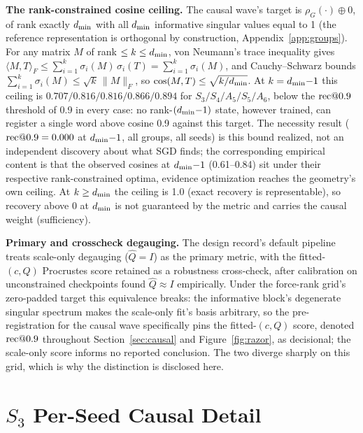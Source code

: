 \textbf{The rank-constrained cosine ceiling.} The causal wave's target
is $\rho_G(\cdot) \oplus 0$, of rank exactly $d_{\min}$ with all $d_{\min}$
informative singular values equal to 1 (the reference representation is
orthogonal by construction, Appendix~\ref{app:groups}). For any matrix
$M$ of rank $\leq k \leq d_{\min}$, von Neumann's trace inequality gives
$\langle M, T\rangle_F \leq \sum_{i=1}^{k} \sigma_i(M)\,\sigma_i(T) =
\sum_{i=1}^{k} \sigma_i(M)$, and Cauchy--Schwarz bounds
$\sum_{i=1}^{k} \sigma_i(M) \leq \sqrt{k}\,\lVert M \rVert_F$, so
$\cos(M, T) \leq \sqrt{k/d_{\min}}$. At $k = d_{\min}{-}1$ this ceiling is
$0.707/0.816/0.816/0.866/0.894$ for $S_3/S_4/A_5/S_5/A_6$, below the
$\mathrm{rec}@0.9$ threshold of 0.9 in every case: no rank-$(d_{\min}{-}1)$
state, however trained, can register a single word above cosine 0.9
against this target. The necessity result ($\mathrm{rec}@0.9 = 0.000$ at
$d_{\min}{-}1$, all groups, all seeds) is this bound realized, not an
independent discovery about what SGD finds; the corresponding empirical
content is that the observed cosines at $d_{\min}{-}1$ (0.61--0.84) sit
under their respective rank-constrained optima, evidence optimization
reaches the geometry's own ceiling. At $k \geq d_{\min}$ the ceiling is
1.0 (exact recovery is representable), so recovery above 0 at $d_{\min}$
is not guaranteed by the metric and carries the causal weight
(sufficiency).

\textbf{Primary and crosscheck degauging.} The design record's default
pipeline treats scale-only degauging ($\hat{Q} = I$) as the primary
metric, with the fitted-$(c, Q)$ Procrustes score retained as a
robustness cross-check, after calibration on unconstrained checkpoints
found $\hat{Q} \approx I$ empirically. Under the force-rank grid's
zero-padded target this equivalence breaks: the informative block's
degenerate singular spectrum makes the scale-only fit's basis
arbitrary, so the pre-registration for the causal wave specifically
pins the fitted-$(c, Q)$ score, denoted $\mathrm{rec}@0.9$ throughout
Section~\ref{sec:causal} and Figure~\ref{fig:razor}, as decisional; the
scale-only score informs no reported conclusion. The two diverge
sharply on this grid, which is why the distinction is disclosed here.

\section{$S_3$ Per-Seed Causal Detail}
\label{app:s3causal}

